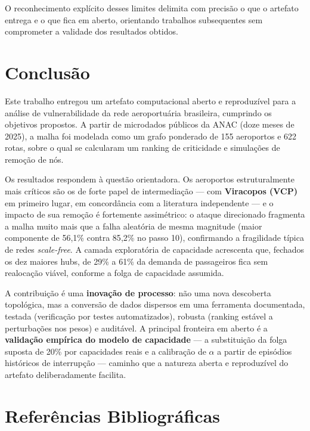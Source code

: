 \documentclass[12pt,a4paper]{article}
\begin{document}
O reconhecimento explícito desses limites delimita com precisão o que o artefato entrega e o que
fica em aberto, orientando trabalhos subsequentes sem comprometer a validade dos resultados
obtidos.

\section{Conclusão}

Este trabalho entregou um artefato computacional aberto e reproduzível para a análise de
vulnerabilidade da rede aeroportuária brasileira, cumprindo os objetivos propostos. A partir de
microdados públicos da ANAC (doze meses de 2025), a malha foi modelada como um grafo ponderado de
155 aeroportos e 622 rotas, sobre o qual se calcularam um ranking de criticidade e simulações de
remoção de nós.

Os resultados respondem à questão orientadora. Os aeroportos estruturalmente mais críticos são os
de forte papel de intermediação --- com \textbf{Viracopos (VCP)} em primeiro lugar, em
concordância com a literatura independente --- e o impacto de sua remoção é fortemente assimétrico:
o ataque direcionado fragmenta a malha muito mais que a falha aleatória de mesma magnitude
(maior componente de 56{,}1\% contra 85{,}2\% no passo 10), confirmando a fragilidade típica de
redes \textit{scale-free}. A camada exploratória de capacidade acrescenta que, fechados os dez
maiores hubs, de 29\% a 61\% da demanda de passageiros fica sem realocação viável, conforme a
folga de capacidade assumida.

A contribuição é uma \textbf{inovação de processo}: não uma nova descoberta topológica, mas a
conversão de dados dispersos em uma ferramenta documentada, testada (verificação por testes
automatizados), robusta (ranking estável a perturbações nos pesos) e auditável. A principal fronteira em
aberto é a \textbf{validação empírica do modelo de capacidade} --- a substituição da folga
suposta de 20\% por capacidades reais e a calibração de $\alpha$ a partir de episódios históricos
de interrupção --- caminho que a natureza aberta e reproduzível do artefato deliberadamente
facilita.

\section{Referências Bibliográficas}
\end{document}
